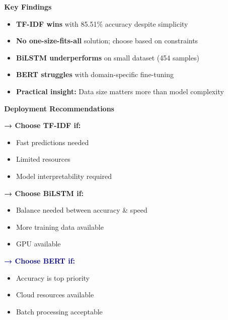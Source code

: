 \documentclass[final]{beamer}
\newlength{\onecolwid}
\newlength{\twocolwid}
\begin{document}
\begin{frame}[fragile]
\begin{columns}[t]
\begin{column}{\twocolwid}
\end{column}

\begin{column}{\onecolwid}

\begin{alertblock}{\Large \textbf{Key Findings}}
  \begin{itemize}
    \setlength\itemsep{0.8em}
    \item \textbf{TF-IDF wins} with 85.51\% accuracy despite simplicity
    \item \textbf{No one-size-fits-all} solution; choose based on constraints
    \item \textbf{BiLSTM underperforms} on small dataset (454 samples)
    \item \textbf{BERT struggles} with domain-specific fine-tuning
    \item \textbf{Practical insight:} Data size matters more than model complexity
  \end{itemize}
\end{alertblock}

\begin{block}{\Large \textbf{Deployment Recommendations}}
  
  \textbf{\textcolor{accentgreen}{→ Choose TF-IDF if:}}
  \begin{itemize}
    \setlength\itemsep{0.3em}
    \item[$\bullet$] Fast predictions needed
    \item[$\bullet$] Limited resources
    \item[$\bullet$] Model interpretability required
  \end{itemize}
  
  \vspace{0.3cm}
  \textbf{\textcolor{accent}{→ Choose BiLSTM if:}}
  \begin{itemize}
    \setlength\itemsep{0.3em}
    \item[$\bullet$] Balance needed between accuracy \& speed
    \item[$\bullet$] More training data available
    \item[$\bullet$] GPU available
  \end{itemize}
  
  \vspace{0.3cm}
  \textbf{\textcolor{darkblue}{→ Choose BERT if:}}
  \begin{itemize}
    \setlength\itemsep{0.3em}
    \item[$\bullet$] Accuracy is top priority
    \item[$\bullet$] Cloud resources available
    \item[$\bullet$] Batch processing acceptable
  \end{itemize}
\end{block}


\end{column}
\end{columns}
\end{frame}
\end{document}
